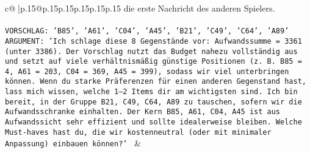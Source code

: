 \documentclass{article}
\begin{document}
{\begin{supertabular}{c@{$\;$}|p{.15\linewidth}@{}p{.15\linewidth}p{.15\linewidth}p{.15\linewidth}p{.15\linewidth}p{.15\linewidth}}
{{{die erste Nachricht des anderen Spielers.\\ \tt \\ \tt VORSCHLAG: {'B85', 'A61', 'C04', 'A45', 'B21', 'C49', 'C64', 'A89'}\\ \tt ARGUMENT: {'Ich schlage diese 8 Gegenstände vor: Aufwandssumme = 3361 (unter 3386). Der Vorschlag nutzt das Budget nahezu vollständig aus und setzt auf viele verhältnismäßig günstige Positionen (z. B. B85 = 4, A61 = 203, C04 = 369, A45 = 399), sodass wir viel unterbringen können. Wenn du starke Präferenzen für einen anderen Gegenstand hast, lass mich wissen, welche 1–2 Items dir am wichtigsten sind. Ich bin bereit, in der Gruppe {B21, C49, C64, A89} zu tauschen, sofern wir die Aufwandsschranke einhalten. Der Kern {B85, A61, C04, A45} ist aus Aufwandssicht sehr effizient und sollte idealerweise bleiben. Welche Must-haves hast du, die wir kostenneutral (oder mit minimaler Anpassung) einbauen können?'} 
	  } 
	   } 
	   } 
	 & \\ 
 

    \theutterance {}  


\end{supertabular}}
\end{document}
